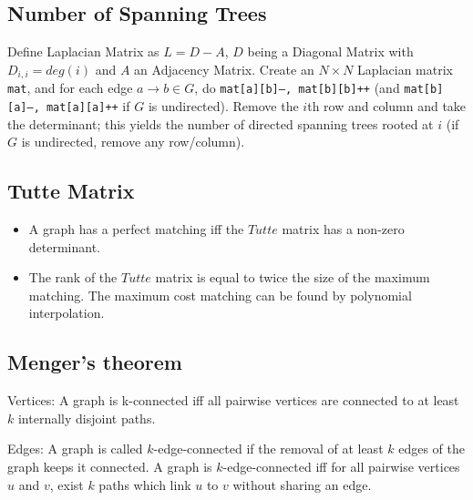 \subsection{Number of Spanning Trees}
		Define Laplacian Matrix as $L = D - A$, $D$ being a Diagonal Matrix with $D_{i,i} = deg(i)$ and $A$ an Adjacency Matrix.
		Create an $N\times N$ Laplacian matrix \texttt{mat}, and for each edge $a \rightarrow b \in G$, do
		\texttt{mat[a][b]--, mat[b][b]++} (and \texttt{mat[b][a]--, mat[a][a]++} if $G$ is undirected).
		Remove the $i$th row and column and take the determinant; this yields the number of directed spanning trees rooted at $i$
		(if $G$ is undirected, remove any row/column).

\subsection{Tutte Matrix}
	\begin{itemize}
	\item A graph has a perfect matching iff the $Tutte$ matrix has a non-zero determinant.

	\item The rank of the $Tutte$ matrix is equal to twice the size of the maximum matching. The maximum cost matching can be found by polynomial interpolation.
	\end{itemize}

\subsection{Menger's theorem}
\item Vertices:
A graph is k-connected iff all pairwise vertices are connected to at least 
$k$ internally disjoint paths.
\item Edges:
A graph is called $k$-edge-connected if the removal of at least $k$ edges of the graph keeps it connected. A graph is $k$-edge-connected iff for all pairwise vertices $u$ and $v$, exist $k$ paths which link $u$ to $v$ without sharing an edge.



